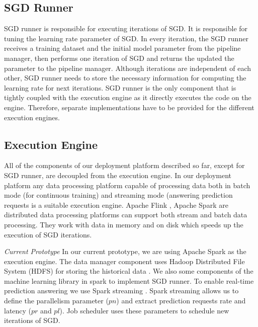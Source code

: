 \subsection{SGD Runner} 
SGD runner is responsible for executing iterations of SGD.
It is responsible for tuning the learning rate parameter of SGD.
In every iteration, the SGD runner receives a training dataset and the initial model parameter from the pipeline manager, then performs one iteration of SGD and returns the updated the parameter to the pipeline manager.
Although iterations are independent of each other, SGD runner needs to store the necessary information for computing the learning rate for next iterations.
SGD runner is the only component that is tightly coupled with the execution engine as it directly executes the code on the engine.
Therefore, separate implementations have to be provided for the different execution engines.


\subsection{Execution Engine}
All of the components of our deployment platform described so far, except for SGD runner, are decoupled from the execution engine.
In our deployment platform any data processing platform capable of processing data both in batch mode (for continuous training) and streaming mode (answering prediction requests is a suitable execution engine.
Apache Flink \cite{carbone2015apache}, Apache Spark \cite{zaharia2010spark} are distributed data processing platforms can support both stream and batch data processing.
They work with data in memory and on disk which speeds up the execution of SGD iterations.

\textit{Current Prototype}
In our current prototype, we are using Apache Spark \cite{zaharia2010spark} as the execution engine.
The data manager component uses Hadoop Distributed File System (HDFS) for storing the historical data \cite{shvachko2010hadoop}.
We also some components of the machine learning library in spark to implement SGD runner.
To enable real-time prediction answering we use Spark streaming \cite{zaharia2013discretized}.
Spark streaming allows us to define the parallelism parameter ($pn$) and extract prediction requests rate and latency ($pr$ and $pl$).
Job scheduler uses these parameters to schedule new iterations of SGD.
